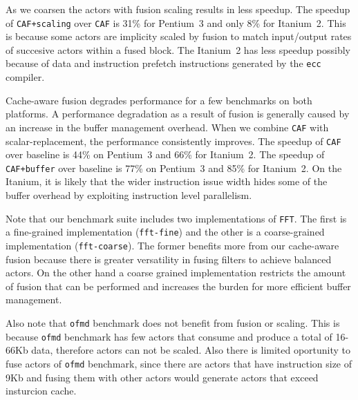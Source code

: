 As we coarsen the actors with fusion scaling results in less speedup.
The speedup of \texttt{CAF+scaling} over \texttt{CAF} is
31\% for Pentium~3 and only 8\% for Itanium~2. This is because some actors
are implicity scaled by fusion to match input/output rates of succesive 
actors within a fused block. The Itanium~2 has less speedup possibly
because of data and instruction prefetch instructions generated by the 
\texttt{ecc} compiler.




Cache-aware fusion degrades performance for a few benchmarks on both platforms.
A performance degradation as a result of fusion is generally caused by
an increase in the buffer management overhead. When
we combine \texttt{CAF} with scalar-replacement, the
performance consistently improves. 
The speedup of \texttt{CAF} over baseline is 44\% on Pentium~3
and 66\% for Itanium~2. 
The speedup of \texttt{CAF+buffer} over baseline is 77\% on Pentium~3
and 85\% for Itanium~2. 
On the Itanium, it is likely that
the wider instruction issue width hides some of the buffer overhead by
exploiting instruction level parallelism.

Note that our benchmark suite
includes two implementations of \texttt{FFT}. The first is a
fine-grained implementation (\texttt{fft-fine}) and the other is a
coarse-grained implementation (\texttt{fft-coarse}). The former
benefits more from our cache-aware fusion because there is greater
versatility in fusing filters to achieve balanced actors. On the other hand
a coarse grained implementation restricts the amount of fusion that
can be performed and increases the burden for more efficient buffer
management. 

Also note that \texttt{ofmd} benchmark does not benefit from fusion or
scaling. This is because \texttt{ofmd} benchmark has few actors that consume 
and produce a total of 16-66Kb data, therefore actors can not be scaled.
Also there is limited oportunity to fuse actors of \texttt{ofmd} 
benchmark, since there are actors that have instruction size of 9Kb 
and fusing them with other actors would generate actors that exceed 
insturcion cache.

